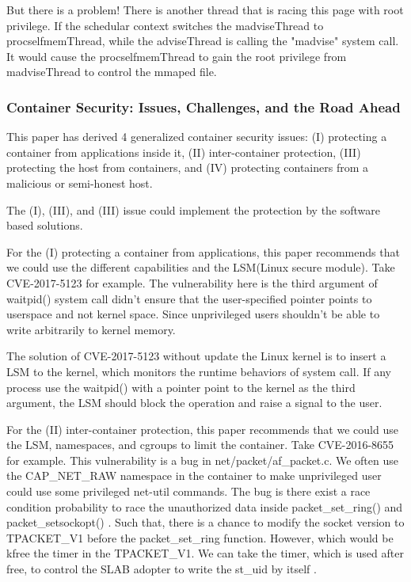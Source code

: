 \documentclass[12pt,a4paper]{article}
\begin{document}
But there is a problem! There is another thread that is racing this page with root privilege.
If the schedular context switches the madviseThread to procselfmemThread, while the
adviseThread is calling the "madvise" system call. It would cause the procselfmemThread
to gain the root privilege from madviseThread to control the mmaped file.

\subsubsection{Container Security: Issues, Challenges, and the Road Ahead}
This paper \cite{Road_Ahead} has derived 4 generalized container security issues:
(\RN{1}) protecting a container from applications inside it, (\RN{2}) inter-container
protection, (\RN{3}) protecting the host from containers, and (\RN{4}) protecting containers
from a malicious or semi-honest host. \cite{Road_Ahead}

The (\RN{1}), (\RN{3}), and (\RN{3}) issue could implement the protection by the software
based solutions.

For the (\RN{1}) protecting a container from applications, this paper recommends that
we could use the different capabilities and the LSM(Linux secure module). Take
CVE-2017-5123 \cite{CVE-2017-5123} for example. The vulnerability here is the third argument of
waitpid() system call didn't ensure that the user-specified pointer points to userspace
and not kernel space. Since unprivileged users shouldn’t be able to write arbitrarily
to kernel memory.

The solution of CVE-2017-5123 without update the Linux kernel is to insert a
LSM to the kernel, which monitors the runtime behaviors of system call. If any process
use the waitpid() with a pointer point to the kernel as the third argument, the LSM should
block the operation and raise a signal to the user.

For the (\RN{2}) inter-container protection, this paper recommends that we could use the
LSM, namespaces, and cgroups to limit the container. Take CVE-2016-8655 \cite{CVE-2016-8655}
for example. This vulnerability is a bug in net/packet/af\_packet.c. We often use the
CAP\_NET\_RAW namespace in the container to make unprivileged user could use some privileged
net-util commands. The bug is there exist a race condition probability to race the unauthorized
data inside packet\_set\_ring() and packet\_setsockopt() \cite{CVE-2016-8655-lwn}. Such that,
there is a chance to modify the socket version to TPACKET\_V1 before the packet\_set\_ring
function. However, which would be kfree the timer in the TPACKET\_V1. We can take the timer,
which is used after free, to control the SLAB adopter to write the st\_uid by itself
\cite{AF_PACKET}.
\end{document}
